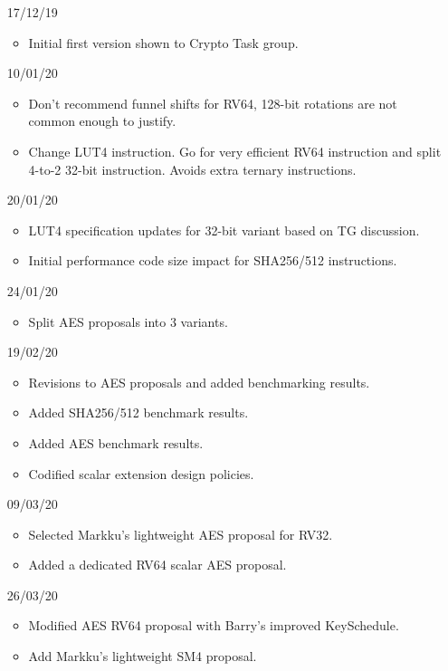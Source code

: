
\begin{itemize}
\item[17/12/19] \begin{itemize}
    \item Initial first version shown to Crypto Task group.
\end{itemize}
\item[10/01/20] \begin{itemize}
    \item Don't recommend funnel shifts for RV64, 128-bit rotations
          are not common enough to justify.
    \item Change LUT4 instruction. Go for very efficient RV64 instruction
          and split 4-to-2 32-bit instruction.
          Avoids extra ternary instructions.
\end{itemize}
\item[20/01/20] \begin{itemize}
    \item LUT4 specification updates for 32-bit variant based on TG discussion.
    \item Initial performance code size impact for SHA256/512 instructions.
\end{itemize}
\item[24/01/20] \begin{itemize}
    \item Split AES proposals into 3 variants.
\end{itemize}
\item[19/02/20] \begin{itemize}
    \item Revisions to AES proposals and added benchmarking results.
    \item Added SHA256/512 benchmark results.
    \item Added AES        benchmark results.
    \item Codified scalar extension design policies.
\end{itemize}
\item[09/03/20] \begin{itemize}
    \item Selected Markku's lightweight AES proposal for RV32.
    \item Added a dedicated RV64 scalar AES proposal.
\end{itemize}
\item[26/03/20] \begin{itemize}
    \item Modified AES RV64 proposal with Barry's improved KeySchedule.
    \item Add Markku's lightweight SM4 proposal.
\end{itemize}
\end{itemize}
